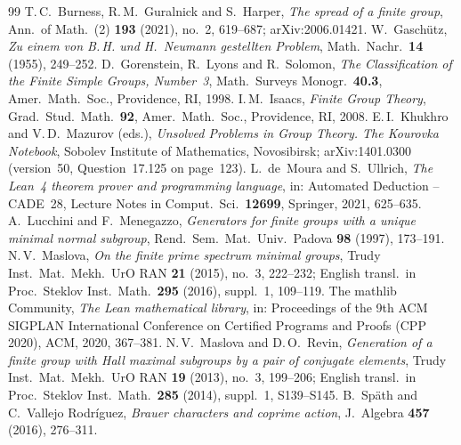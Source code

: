 \documentclass[11pt,colorlinks]{charlie}
\begin{document}
\begin{thebibliography}{99}\small
{} T.\,C.~Burness, R.\,M.~Guralnick and S.~Harper, \emph{The spread of a finite group}, Ann.\ of Math.\ (2) \textbf{193} (2021), no.~2, 619--687; arXiv:2006.01421.
 W.~Gasch\"utz, \emph{Zu einem von B.\,H. und H.~Neumann gestellten Problem}, Math.\ Nachr.\ \textbf{14} (1955), 249--252.
 D.~Gorenstein, R.~Lyons and R.~Solomon, \emph{The Classification of the Finite Simple Groups, Number~3}, Math.\ Surveys Monogr.\ \textbf{40.3}, Amer.\ Math.\ Soc., Providence, RI, 1998.
 I.\,M.~Isaacs, \emph{Finite Group Theory}, Grad.\ Stud.\ Math.\ \textbf{92}, Amer.\ Math.\ Soc., Providence, RI, 2008.
 E.\,I.~Khukhro and V.\,D.~Mazurov (eds.), \emph{Unsolved Problems in Group Theory. The Kourovka Notebook}, Sobolev Institute of Mathematics, Novosibirsk; arXiv:1401.0300 (version~50, Question~17.125 on page~123).
 L.~de~Moura and S.~Ullrich, \emph{The Lean~4 theorem prover and programming language}, in: Automated Deduction -- CADE~28, Lecture Notes in Comput.\ Sci.\ \textbf{12699}, Springer, 2021, 625--635.
 A.~Lucchini and F.~Menegazzo, \emph{Generators for finite groups with a unique minimal normal subgroup}, Rend.\ Sem.\ Mat.\ Univ.\ Padova \textbf{98} (1997), 173--191.
 N.\,V.~Maslova, \emph{On the finite prime spectrum minimal groups}, Trudy Inst.\ Mat.\ Mekh.\ UrO RAN \textbf{21} (2015), no.~3, 222--232; English transl.\ in Proc.\ Steklov Inst.\ Math.\ \textbf{295} (2016), suppl.~1, 109--119.
 The mathlib Community, \emph{The Lean mathematical library}, in: Proceedings of the 9th ACM SIGPLAN International Conference on Certified Programs and Proofs (CPP 2020), ACM, 2020, 367--381.
 N.\,V.~Maslova and D.\,O.~Revin, \emph{Generation of a finite group with Hall maximal subgroups by a pair of conjugate elements}, Trudy Inst.\ Mat.\ Mekh.\ UrO RAN \textbf{19} (2013), no.~3, 199--206; English transl.\ in Proc.\ Steklov Inst.\ Math.\ \textbf{285} (2014), suppl.~1, S139--S145.
 B.~Sp\"ath and C.~Vallejo Rodr\'iguez, \emph{Brauer characters and coprime action}, J.\ Algebra \textbf{457} (2016), 276--311.
\end{thebibliography}
\end{document}
